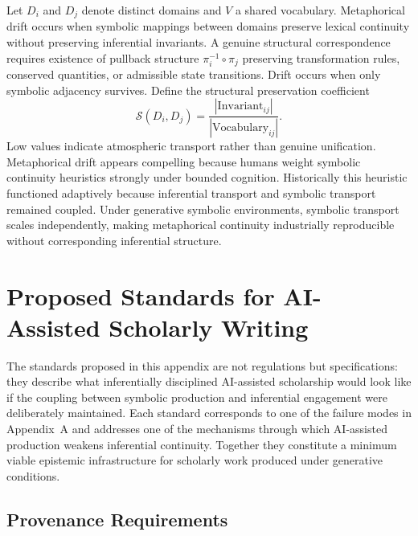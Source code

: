 \documentclass[12pt, openright, twoside]{book}
\begin{document}
Let $D_i$ and $D_j$ denote distinct domains and $V$ a shared vocabulary.
Metaphorical drift occurs when symbolic mappings between domains preserve
lexical continuity without preserving inferential invariants. A genuine
structural correspondence requires existence of pullback structure
$\pi_i^{-1} \circ \pi_j$ preserving transformation rules, conserved
quantities, or admissible state transitions. Drift occurs when only
symbolic adjacency survives. Define the structural preservation coefficient
\[
\mathcal{S}(D_i, D_j)
= \frac{|\mathrm{Invariant}_{ij}|}{|\mathrm{Vocabulary}_{ij}|}.
\]
Low values indicate atmospheric transport rather than genuine unification.
Metaphorical drift appears compelling because humans weight symbolic
continuity heuristics strongly under bounded cognition. Historically this
heuristic functioned adaptively because inferential transport and symbolic
transport remained coupled. Under generative symbolic environments,
symbolic transport scales independently, making metaphorical continuity
industrially reproducible without corresponding inferential structure.

\chapter{Proposed Standards for AI-Assisted Scholarly Writing}

The standards proposed in this appendix are not regulations but
specifications: they describe what inferentially disciplined AI-assisted
scholarship would look like if the coupling between symbolic production
and inferential engagement were deliberately maintained. Each standard
corresponds to one of the failure modes in Appendix~A and addresses one
of the mechanisms through which AI-assisted production weakens inferential
continuity. Together they constitute a minimum viable epistemic
infrastructure for scholarly work produced under generative conditions.

\section{Provenance Requirements}
\end{document}
